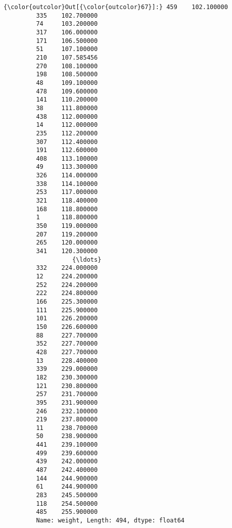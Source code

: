 \documentclass[11pt]{article}
\begin{document}
\begin{Verbatim}[commandchars=\\\{\}]
{\color{outcolor}Out[{\color{outcolor}67}]:} 459    102.100000
         335    102.700000
         74     103.200000
         317    106.000000
         171    106.500000
         51     107.100000
         210    107.585456
         270    108.100000
         198    108.500000
         48     109.100000
         478    109.600000
         141    110.200000
         38     111.800000
         438    112.000000
         14     112.000000
         235    112.200000
         307    112.400000
         191    112.600000
         408    113.100000
         49     113.300000
         326    114.000000
         338    114.100000
         253    117.000000
         321    118.400000
         168    118.800000
         1      118.800000
         350    119.000000
         207    119.200000
         265    120.000000
         341    120.300000
                   {\ldots}    
         332    224.000000
         12     224.200000
         252    224.200000
         222    224.800000
         166    225.300000
         111    225.900000
         101    226.200000
         150    226.600000
         88     227.700000
         352    227.700000
         428    227.700000
         13     228.400000
         339    229.000000
         182    230.300000
         121    230.800000
         257    231.700000
         395    231.900000
         246    232.100000
         219    237.800000
         11     238.700000
         50     238.900000
         441    239.100000
         499    239.600000
         439    242.000000
         487    242.400000
         144    244.900000
         61     244.900000
         283    245.500000
         118    254.500000
         485    255.900000
         Name: weight, Length: 494, dtype: float64
\end{Verbatim}
            

    
    
    
    
\end{document}
